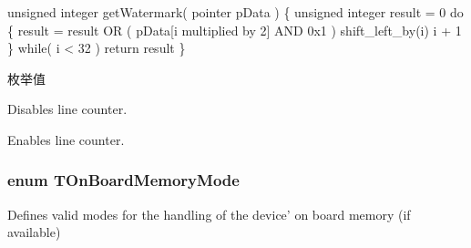 \begin{DoxyCode}
\textcolor{keywordtype}{unsigned} integer getWatermark( pointer pData )
\{
  \textcolor{keywordtype}{unsigned} integer result = 0
  \textcolor{keywordflow}{do}
  \{
    result = result OR ( pData[i multiplied by 2] AND 0x1 ) shift\_left\_by(i)
    i + 1
  \} while( i < 32 )
  return result
\}
\end{DoxyCode}
 \begin{Desc}
\item[枚举值]\par
\begin{description}
\item[{\em 
\hypertarget{group___device_specific_interface_ggab9051a0d97eafeaff2951aa0196f14eba197c1ef2f2c0d4489d90e46475b6fbb7}{lc\+Off}\label{group___device_specific_interface_ggab9051a0d97eafeaff2951aa0196f14eba197c1ef2f2c0d4489d90e46475b6fbb7}
}]Disables line counter. \item[{\em 
\hypertarget{group___device_specific_interface_ggab9051a0d97eafeaff2951aa0196f14eba283c11769946008dea6ec3f69806a0af}{lc\+On}\label{group___device_specific_interface_ggab9051a0d97eafeaff2951aa0196f14eba283c11769946008dea6ec3f69806a0af}
}]Enables line counter. \end{description}
\end{Desc}
\hypertarget{group___device_specific_interface_gafeb5475c72e0081fb102cb94b4c26a1b}{
\subsubsection[{T\+On\+Board\+Memory\+Mode}]{\setlength{\rightskip}{0pt plus 5cm}enum {\bf T\+On\+Board\+Memory\+Mode}}}\label{group___device_specific_interface_gafeb5475c72e0081fb102cb94b4c26a1b}


Defines valid modes for the handling of the device' on board memory (if available) 

